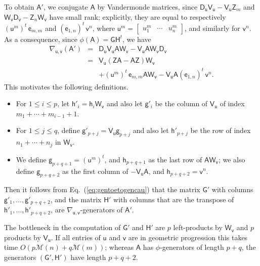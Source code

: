 \documentclass{sig-alternate}
\newcommand{\ve}{\ensuremath{\mathsf{e}}}
\newcommand{\vg}{\ensuremath{\mathsf{g}}}
\newcommand{\vh}{\ensuremath{\mathsf{h}}}
\newcommand{\vu}{\ensuremath{\mathsf{u}}}
\newcommand{\vv}{\ensuremath{\mathsf{v}}}
\newcommand{\mA}{\ensuremath{\mathsf{A}}}
\newcommand{\mD}{\ensuremath{\mathsf{D}}}
\newcommand{\mG}{\ensuremath{\mathsf{G}}}
\newcommand{\mH}{\ensuremath{\mathsf{H}}}
\newcommand{\mV}{\ensuremath{\mathsf{V}}}
\newcommand{\mW}{\ensuremath{\mathsf{W}}}
\newcommand{\mZ}{\ensuremath{\mathsf{Z}}}
\newcommand{\M}{\ensuremath{\mathscr{M}}}
\begin{document}
To obtain $\mA'$, we conjugate $\mA$ by Vandermonde matrices, since $
\mD_{\vu} \mV_{\vu} - \mV_{\vu} \mZ_m$ and $ \mW_{\vv} \mD_{\vv} -
\mZ_n \mW_{\vv}$ have small rank; explicitly, they are equal to
respectively $(\vu^m)^t \, \ve_{m,m}$ and $(\ve_{1,n})^t \, \vv^n$,
where $\vu^m = \begin{bmatrix} u_1^m & \cdots & u_n^m \end{bmatrix}$,
and similarly for $\vv^n$. As a
consequence, since $\phi(\mA)=\mG \mH^t$, we have
\begin{eqnarray}
  \nabla_{\vu, \vv} \left( \mathsf{A}' \right) & = & \mD_{\vu}  \mV_{\vu} 
  \mathsf{A}  \mW_{\vv} - \mV_{\vu}  \mathsf{A}  \mW_{\vv}  \mD_{\vv} \nonumber \\
  & = & \mV_{\vu}  \left( \mZ  \mathsf{A} - \mathsf{A}  \mZ \right) \mW_{\vv} 
  \label{eq:gentoetogencau}\\
  &   & + (\vu^m)^t \, \ve_{m,m}  \mathsf{A}  \mW_{\vv} 
        - \mV_{\vu}  \mathsf{A}  (\ve_{1,n})^t \, \vv^n . \nonumber 
\end{eqnarray}
This motivates the following definitions.
\begin{itemize}
\item For $1 \le i \le p$, let $\vh'_i=\vh_i \mW_\vv$ and also let $\vg'_{i}$ be
  the column of $\mV_\vu$ of index $m_1 + \cdots +m_{i-1}+1$.
  
\item For $1 \le j \le q$, define $\vg'_{p+j} = \mV_\vu \vg_{p+j}$ and also let
  $\vh'_{p+j}$ be the row of index $n_1 + \cdots +n_j$ in $\mW_\vv$.

\item We define $\vg_{p+q+1} = (\vu^m)^t$, and $\vh_{p+q+1}$ as the last row of
  $\mA \mW_\vv$; we also define $\vg_{p+q+2}$ as the first column of
  $-\mV_\vu \mA$, and $\vh_{p+q+2} = \vv^n$.
\end{itemize}

Then it follows from Eq.~(\ref{eq:gentoetogencau}) that the matrix $\mG'$
with columns $\vg'_1,\dots,\vg'_{p+q+2}$, and the matrix $\mH'$ with columns
that are the transpose of $\vh'_1,\dots,\vh'_{p+q+2}$, are
$\nabla_{\vu,\vv}$-generators of $\mA'$.

The bottleneck in the computation of $\mG'$ and $\mH'$ are $p$
left-products by $\mW_\vv$ and $p$ products by $\mV_\vu$.  If all
entries of $\vu$ and $\vv$ are in geometric progression this takes
time $O(p \M(n) + q \M(m))$; whereas $\mA$ has $\phi$-generators of
length $p+q$, the generators $(\mG',\mH')$ have length $p+q+2$.
\end{document}
